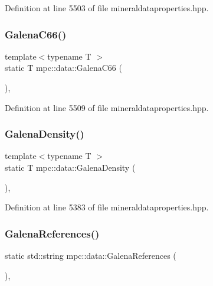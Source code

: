 Definition at line 5503 of file mineraldataproperties.\+hpp.

\mbox{\label{namespacempc_1_1data_a285c7ca89a0323c93ab6ce51abbd9096}} 
\subsubsection{\texorpdfstring{Galena\+C66()}{GalenaC66()}}
{\footnotesize\ttfamily template$<$typename T $>$ \\
static T mpc\+::data\+::\+Galena\+C66 (\begin{DoxyParamCaption}{ }\end{DoxyParamCaption})\hspace{0.3cm}{\ttfamily [inline]}, {\ttfamily [static]}}



Definition at line 5509 of file mineraldataproperties.\+hpp.

\mbox{\label{namespacempc_1_1data_a12025d112a84d504734103f6d9fe04bc}} 
\subsubsection{\texorpdfstring{Galena\+Density()}{GalenaDensity()}}
{\footnotesize\ttfamily template$<$typename T $>$ \\
static T mpc\+::data\+::\+Galena\+Density (\begin{DoxyParamCaption}{ }\end{DoxyParamCaption})\hspace{0.3cm}{\ttfamily [inline]}, {\ttfamily [static]}}



Definition at line 5383 of file mineraldataproperties.\+hpp.

\mbox{\label{namespacempc_1_1data_ad0c1ba815c7fde05c0efbe049ba5d1dc}} 
\subsubsection{\texorpdfstring{Galena\+References()}{GalenaReferences()}}
{\footnotesize\ttfamily static std\+::string mpc\+::data\+::\+Galena\+References (\begin{DoxyParamCaption}{ }\end{DoxyParamCaption})\hspace{0.3cm}{\ttfamily [inline]}, {\ttfamily [static]}}



